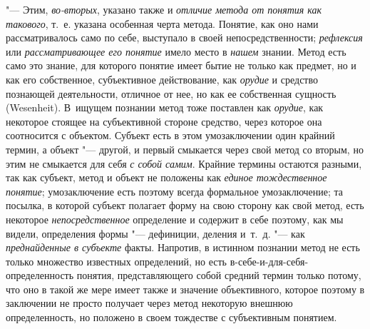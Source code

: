 {{"--- Этим, {\em во-вторых},
указано также и
{\em отличие метода от понятия как
такового}, т.~е. указана особенная черта метода. Понятие,
как оно нами рассматривалось само по себе, выступало в своей
непосредственности; {\em рефлексия}
или {\em рассматривающее
его понятие }имело место в
{\em нашем} знании. Метод
есть само это знание, для которого понятие имеет бытие не только как
предмет, но и как его собственное, субъективное действование, как
{\em орудие} и средство
познающей деятельности, отличное от нее, но как ее собственная сущность
(Wesenheit). В~ищущем познании метод тоже поставлен как
{\em орудие}, как
некоторое стоящее на субъективной стороне средство, через которое она
соотносится с объектом. Субъект есть в этом умозаключении один крайний
термин, а объект "--- другой, и первый смыкается через свой
метод со вторым, но этим не смыкается для себя
{\em с собой самим}.
Крайние термины остаются разными, так как субъект, метод и
объект не положены как {\em единое
тождественное понятие}; умозаключение есть поэтому всегда
формальное умозаключение; та посылка, в которой субъект полагает форму на
свою сторону как свой метод, есть некоторое
{\em непосредственное}
определение и содержит в себе поэтому, как мы видели,
определения формы "--- дефиниции, деления и~т.~д. "---
как {\em преднайденные в
субъекте} факты. Напротив, в истинном познании метод не есть
только множество известных определений, но есть
в-себе-и-для-себя-определенность понятия, представляющего собой средний
термин только потому, что оно в такой же мере имеет также и значение
объективного, которое поэтому в заключении не просто получает через метод
некоторую внешнюю определенность, но положено в своем тождестве с
субъективным понятием.

}}

